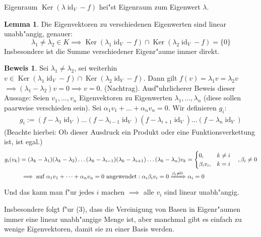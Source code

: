 \documentclass[oneside,fontsize=11pt,paper=a4,BCOR=0mm,DIV=12,automark,headsepline]{scrbook}
\newcommand{\gq}[1]{\glqq{}#1\grqq{}} %
\DeclareMathOperator{\mKer}{Ker}
\DeclareMathOperator{\mId}{id}
\theoremstyle{remark}
\theoremstyle{definition}
\newtheorem{lemma}{Lemma}[section]
\theoremstyle{definition}
\newtheorem*{prof}{Beweis}
\theoremstyle{remark}
\begin{document}
\begin{definition}{Eigenraum}{}
  \(\mKer(\lambda\mId_V-f)\) hei"st Eigenraum zum Eigenwert \(\lambda\).
\end{definition}
\begin{lemma}
  Die Eigenvektoren zu verschiedenen Eigenwerten sind linear unabh"angig, genauer: \[\lambda_1\neq\lambda_2\in K\implies\mKer(\lambda_1\mId_V-f)\cap\mKer(\lambda_2\mId_V-f)=\{0\}\]
  Insbesondere ist die Summe verschiedener Eigenr"aume immer direkt.
\end{lemma}
\begin{prof}
  Sei \(\lambda_1\neq\lambda_2\), sei weiterhin \(v\in\mKer(\lambda_1\mId_V-f)\cap\mKer(\lambda_2\mId_V-f)\). Dann gilt \(f(v)=\lambda_1v=\lambda_2v\) \(\implies(\lambda_1-\lambda_2)v = 0\implies v = 0\).
(Nachtrag). Ausf"uhrlicherer Beweis dieser Aussage: Seien \(v_1,\dots,v_n\) Eigenvektoren zu Eigenwerten \(\lambda_1,\dots,\lambda_n\) (diese sollen paarweise verschieden sein). Sei \(\alpha_1 v_1+\dots + \alpha_nv_n = 0\). Wir definieren \(g_i\):
  \begin{align*}
    g_i := (f-\lambda_1\mId_V)\dots(f-\lambda_{i-1}\mId_V)(f-\lambda_{i+1}\mId_V)\dots(f-\lambda_n\mId_V)
  \end{align*}
  (Beachte hierbei: Ob dieser Ausdruck ein Produkt oder eine Funktionsverkettung ist, ist egal.)
  \begin{align*}
    g_i(v_k) &= (\lambda_k-\lambda_1)(\lambda_k-\lambda_2)\dots(\lambda_k-\lambda_{i-1})(\lambda_k-\lambda_{i+1})\dots(\lambda_k-\lambda_n)v_k =
               \begin{cases}
                 0, & k\neq i \\
                 \beta_iv_i, & k = i
               \end{cases} \quad ,\beta_i\neq 0 \\
    &\implies \text{auf }\alpha_1v_1+\dots +\alpha_nv_n = 0\text{ angewendet}: \alpha_i\beta_iv_i = 0 \xRightarrow{\beta_i \neq 0} \alpha_i = 0
  \end{align*}
  Und das kann man f"ur jedes \(i\) machen \(\implies\) alle \(v_i\) sind linear unabh"angig.
\end{prof}
Insbesondere folgt f"ur (3), dass die Vereinigung von Basen in Eigenr"aumen immer eine linear unabh"angige Menge ist, aber manchmal gibt es einfach \gq{zu wenige} Eigenvektoren, damit sie zu einer Basis werden.
\end{document}
